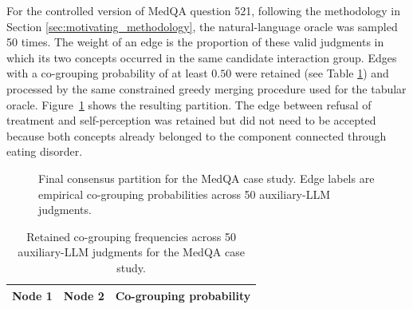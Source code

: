 For the controlled version of MedQA question 521, following the methodology in Section \ref{sec:motivating_methodology}, the natural-language oracle was
sampled 50 times. The weight of an edge is the proportion of these valid judgments
in which its two concepts occurred in the same candidate interaction group. Edges
with a co-grouping probability of at least $0.50$ were retained (see Table \ref{tab:rq5-cogrouping}) and processed by the
same constrained greedy merging procedure used for the tabular oracle. Figure~\ref{fig:rq5-oracle-grouping}
shows the resulting partition. The edge between refusal of treatment and
self-perception was retained but did not need to be accepted because both concepts
already belonged to the component connected through eating disorder.

\begin{figure}[H]
  \centering
  
  \caption[Case study: final consensus partition for MedQA]{Final consensus partition for the MedQA case study. Edge labels are empirical co-grouping probabilities across 50 auxiliary-LLM judgments.}
  \label{fig:rq5-oracle-grouping}
\end{figure}

\begingroup
\small
\newcommand{\RQFiveNode}[5]{%
  \expandafter\def\csname RQFiveAppendixNodeLabel@#1\endcsname{#2}%
}
\newcommand{\RQFiveEdge}[4]{}

\renewcommand{\RQFiveNode}[5]{}
\renewcommand{\RQFiveEdge}[4]{%
  \csname RQFiveAppendixNodeLabel@#1\endcsname &
  \csname RQFiveAppendixNodeLabel@#2\endcsname & #3\tabularnewline
}
\begin{table}[H]
  \centering
  \caption[Case study: retained co-grouping frequencies for MedQA]{Retained co-grouping frequencies across 50 auxiliary-LLM judgments for the MedQA case study.}
  \label{tab:rq5-cogrouping}
  \begin{tabular}{@{}p{}p{}>{\raggedleft\arraybackslash}p{}@{}}
    \hline
    \textbf{Node 1} & \textbf{Node 2} & \textbf{Co-grouping probability}\\
    \hline
    
  \end{tabular}
\end{table}
\endgroup
